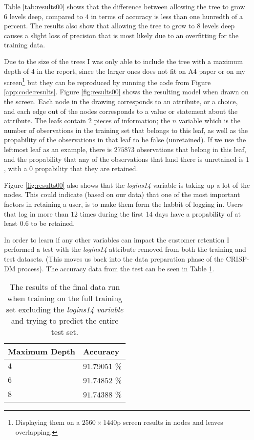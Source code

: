 Table \ref{tab:results00} shows that the difference between allowing the tree to
grow $6$ levels deep, compared to $4$ in terms of accuracy is less than one
hunredth of a percent. The results also show that allowing the tree to grow to
$8$ levels deep causes a slight loss of precision that is most likely due to an
overfitting for the training data.

Due to the size of the trees I was only able to include the tree with a maximum
depth of $4$ in the report, since the larger ones does not fit on A4 paper or on
my screen\footnote{Displaying them on a $2560 \times 1440$p screen results in
nodes and leaves overlapping.} but they can be reproduced by running the code
from Figure \ref{app:code:results}. Figure \ref{fig:results00} shows the
resulting model when drawn on the screen. Each node in the drawing corresponds
to an attribute, or a choice, and each edge out of the nodes corresponds to a
value or statement about the attribute. The leafs contain 2 pieces of
information; the $n$ variable which is the number of observations in the
training set that belongs to this leaf, as well as the propability of the
observations in that leaf to be false (unretained). If we use the leftmost leaf
as an example, there is $275873$ observations that belong in this leaf, and the
propability that any of the observations that land there is unretained is $1$,
with a $0$ propability that they are retained.

\begin{landscape}
\end{landscape}

Figure \ref{fig:results00} also shows that the \textit{logins14} variable is
taking up a lot of the nodes. This could indicate (based on our data) that one
of the most important factors in retaining a user, is to make them form the
habbit of logging in. Users that log in more than $12$ times during the first 14
days have a propability of at least $0.6$ to be retained.

In order to learn if any other variables can impact the customer retention I
performed a test with the \textit{logins14} attribute removed from both the
training and test datasets. (This moves us back into the data preparation phase
of the CRISP-DM process). The accuracy data from the test can be seen in Table
\ref{tab:results01}.

\begin{table}[H]
  \centering
  \begin{tabular}{l|l}
    \textbf{Maximum Depth} & \textbf{Accuracy} \\ \hline
    $4$                    & $91.79051$ \%     \\
    $6$                    & $91.74852$ \%     \\
    $8$                    & $91.74388$ \%
  \end{tabular}
  \caption{The results of the final data run when training on the full training
    set excluding the \textit{logins14 variable} and trying to predict the
    entire test set.}
  \label{tab:results01}
\end{table}

